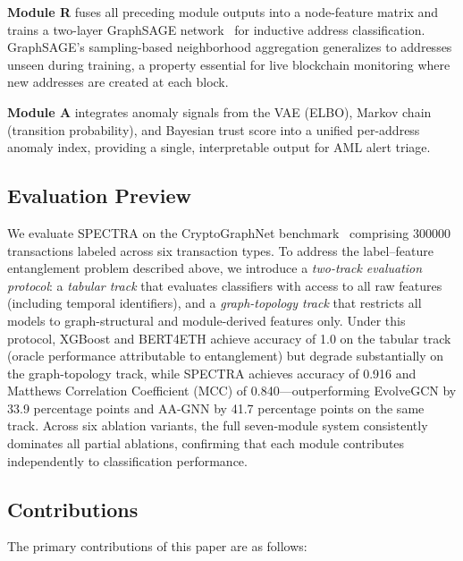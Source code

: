 \textbf{Module R} fuses all preceding module outputs into a node-feature
matrix and trains a two-layer GraphSAGE network~\cite{Hamilton2017} for
inductive address classification.
GraphSAGE's sampling-based neighborhood aggregation generalizes to addresses
unseen during training, a property essential for live blockchain monitoring
where new addresses are created at each block.

\textbf{Module A} integrates anomaly signals from the VAE (ELBO), Markov
chain (transition probability), and Bayesian trust score into a unified
per-address anomaly index, providing a single, interpretable output for
AML alert triage.

\subsection*{Evaluation Preview}

We evaluate SPECTRA on the CryptoGraphNet
benchmark~\cite{Farrugia2020} comprising \num{300000} transactions
labeled across six transaction types.
To address the label--feature entanglement problem described above, we
introduce a \emph{two-track evaluation protocol}: a \emph{tabular track}
that evaluates classifiers with access to all raw features (including temporal
identifiers), and a \emph{graph-topology track} that restricts all models
to graph-structural and module-derived features only.
Under this protocol, XGBoost and BERT4ETH achieve accuracy of \num{1.0} on
the tabular track (oracle performance attributable to entanglement) but
degrade substantially on the graph-topology track, while SPECTRA achieves
accuracy of \num{0.916} and Matthews Correlation Coefficient (MCC) of
\num{0.840}---outperforming EvolveGCN by \num{33.9} percentage points and
AA-GNN by \num{41.7} percentage points on the same track.
Across six ablation variants, the full seven-module system consistently
dominates all partial ablations, confirming that each module contributes
independently to classification performance.

\subsection*{Contributions}

The primary contributions of this paper are as follows:

